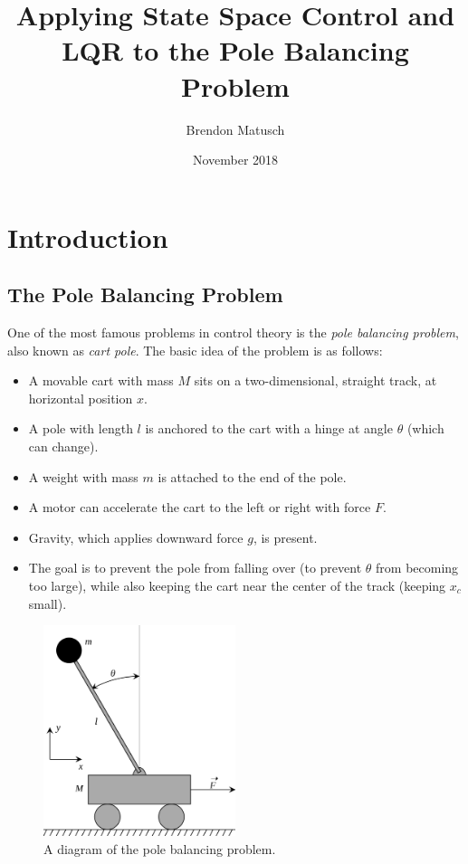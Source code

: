 \documentclass[12pt]{article}
\begin{document}
\title{Applying State Space Control and LQR to the Pole Balancing Problem}
\author{Brendon Matusch}
\date{November 2018}
\maketitle

\section{Introduction}

\subsection{The Pole Balancing Problem}

One of the most famous problems in control theory is the \textit{pole balancing problem}, also known as \textit{cart pole}. The basic idea of the problem is as follows:

\begin{itemize}
    \item A movable cart with mass $M$ sits on a two-dimensional, straight track, at horizontal position $x$.
    \item A pole with length $l$ is anchored to the cart with a hinge at angle $\theta$ (which can change).
    \item A weight with mass $m$ is attached to the end of the pole.
    \item A motor can accelerate the cart to the left or right with force $F$.
    \item Gravity, which applies downward force $g$, is present.
    \item The goal is to prevent the pole from falling over (to prevent $\theta$ from becoming too large), while also keeping the cart near the center of the track (keeping $x _c$ small).
\end{itemize}

\begin{figure}[ht]
    \centering
    \includegraphics[width=0.5\textwidth]{cartpole}
    \caption{\label{cartpole} A diagram of the pole balancing problem.}
\end{figure}
\end{document}
